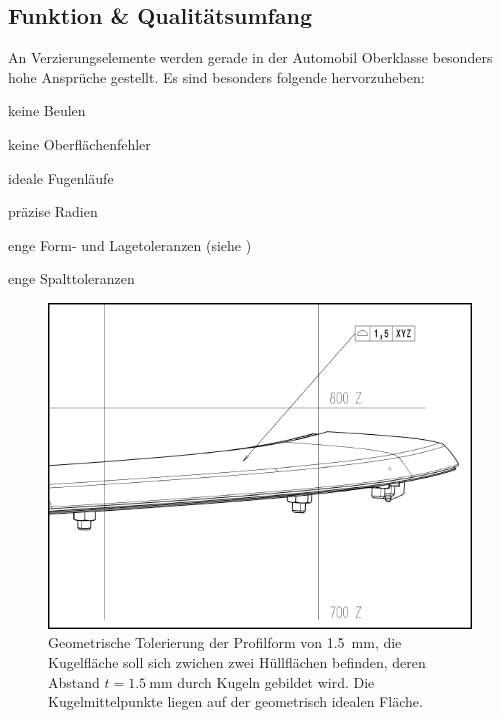 \documentclass[12pt,a4paper,parskip,twoside,BCOR5mm,headsepline]{scrartcl}
\begin{document}
\subsection{Funktion \& Qualitätsumfang}
An Verzierungselemente werden gerade in der Automobil Oberklasse besonders hohe Ansprüche gestellt. Es sind besonders folgende hervorzuheben:
\begin{itemize*}
\item keine Beulen
\item keine Oberflächenfehler
\item ideale Fugenläufe
\item präzise Radien
\item enge Form- und Lagetoleranzen (siehe )
\item enge Spalttoleranzen
\end{itemize*}
\begin{figure}[hbtp]
  \centering
  \includegraphics[width=.8\textwidth]{vdkdtol}
  \caption{Geometrische Tolerierung der Profilform von \SI{1.5}{\milli\meter}, die Kugelfläche soll sich zwichen zwei Hüllflächen befinden, deren Abstand $ t = \SI{1,5}{\milli\meter}$ durch Kugeln gebildet wird. Die Kugelmittelpunkte liegen auf der geometrisch idealen Fläche.   \autocite[113]{tm} }
  \label{fig:vdkdtol}
  \end{figure}
  
\end{document}

